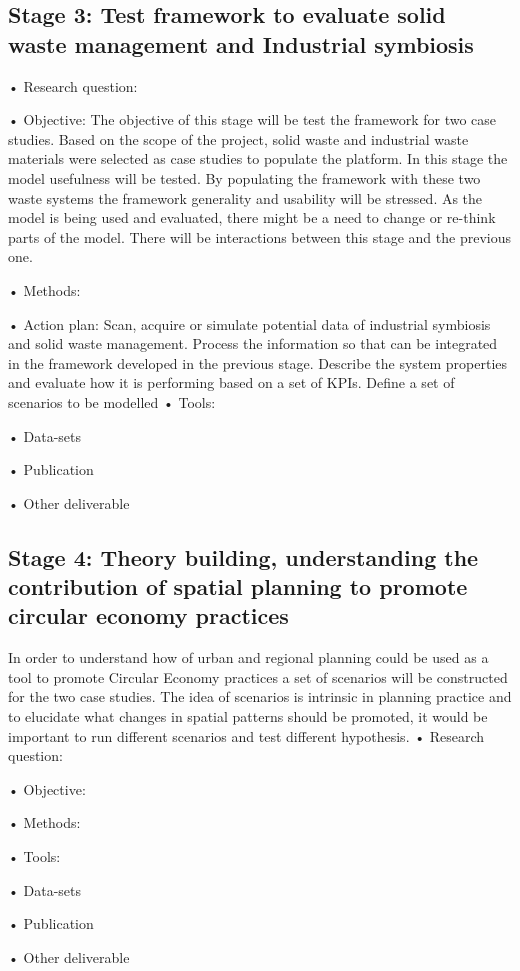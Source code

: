 \subsection{Stage 3: Test framework to evaluate solid waste management and Industrial symbiosis}

•	Research question:            \par
•	Objective: The objective of this stage will be test the framework for two case studies. Based on the scope of the project, solid waste and industrial waste materials were selected as case studies to populate the platform. In this stage the model usefulness will be tested. By populating the framework with these two waste systems the framework generality and usability will be stressed. As the model is being used and evaluated, there might be a need to change or re-think parts of the model. There will be interactions between this stage and the previous one.  \par
•	Methods: \par
•	Action plan: Scan, acquire or simulate potential data of industrial symbiosis and solid waste management. Process the information so that can be integrated in the framework developed in the previous stage. Describe the system properties and evaluate how it is performing based on a set of KPIs. Define a set of scenarios to be modelled 
•	Tools: \par
•	Data-sets \par
•	Publication \par
•	Other deliverable \par


\subsection{Stage 4: Theory building, understanding the contribution of spatial planning to promote circular economy practices}
In order to understand how of urban and regional planning could be used as a tool to promote Circular Economy practices a set of scenarios will be constructed for the two case studies. The idea of scenarios is intrinsic in planning practice and to elucidate what changes in spatial patterns should be promoted, it would be important to run different scenarios and test different hypothesis. 
•	Research question:            \par
•	Objective:      \par
•	Methods: \par
•	Tools: \par
•	Data-sets \par
•	Publication \par
•	Other deliverable \par


